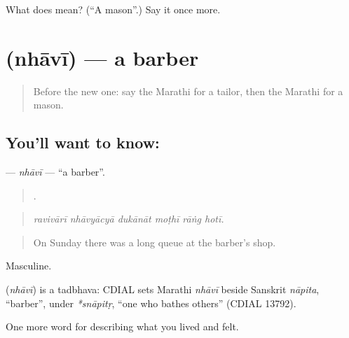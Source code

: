 \begin{tcolorbox}[breakable,colback=teal!4,colframe=teal!35!black,title={Before you move on}]
What does  mean? (\textquotedblleft{}A mason\textquotedblright{}.) Say it once more.
\end{tcolorbox}
\section[\texorpdfstring{\mr{न्हावी} (nhāvī)}{न्हावी (nhāvī)}]{ (nhāvī) — a barber}

\label{lesson:MR-C504-nhavi}



\begin{quote}
Before the new one: say the Marathi for a tailor, then the Marathi for a mason.
\end{quote}

\subsection*{You'll want to know: }
\textbf{} — \emph{nhāvī} — \textquotedblleft{}a barber\textquotedblright{}.

\begin{quote}
     .
\end{quote}

\begin{quote}
\emph{ravivārī nhāvyācyā dukānāt moṭhī rāṅg hotī.}
\end{quote}

\begin{quote}
On Sunday there was a long queue at the barber's shop.
\end{quote}

Masculine.

\begin{cousinweb}
\textbf{} (\emph{nhāvī}) is a tadbhava: CDIAL sets Marathi \emph{nhāvī} beside Sanskrit \emph{nāpita}, \textquotedblleft{}barber\textquotedblright{}, under \emph{*snāpitṛ}, \textquotedblleft{}one who bathes others\textquotedblright{} (CDIAL 13792).
\end{cousinweb}

\begin{grammarlens}[title={What you've built}]
One more word for describing what you lived and felt.
\end{grammarlens}

